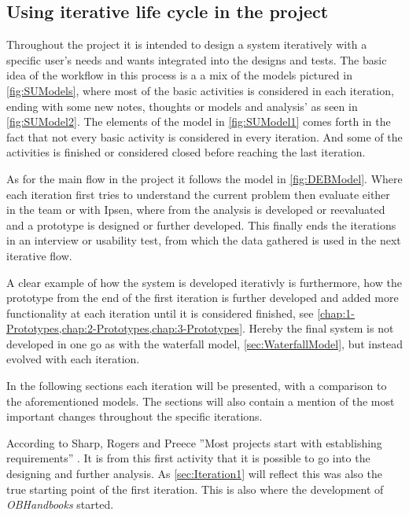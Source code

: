 \subsection{Using iterative life cycle in the project}
Throughout the project it is intended to design a system iteratively with a specific user’s needs and wants integrated into the designs and tests.
The basic idea of the workflow in this process is a a mix of the models pictured in \cref{fig:SUModels}, where most of the basic activities is considered in each iteration, ending with some new notes, thoughts or models and analysis' as seen in \cref{fig:SUModel2}.
The elements of the model in \cref{fig:SUModel1} comes forth in the fact that not every basic activity is considered in every iteration. And some of the activities is finished or considered closed before reaching the last iteration.

As for the main flow in the project it follows the model in \cref{fig:DEBModel}. Where each iteration first tries to understand the current problem then evaluate either in the team or with Ipsen, where from the analysis is developed or reevaluated and a prototype is designed or further developed.
This finally ends the iterations in an interview or usability test, from which the data gathered is used in the next iterative flow.

A clear example of how the system is developed iterativly is furthermore, how the prototype from the end of the first iteration is further developed and added more functionality at each iteration until it is considered finished, see \cref{chap:1-Prototypes,chap:2-Prototypes,chap:3-Prototypes}.
Hereby the final system is not developed in one go as with the waterfall model, \cref{sec:WaterfallModel},  but instead evolved with each iteration.

In the following sections each iteration will be presented, with a comparison to the aforementioned models.
The sections will also contain a mention of the most important changes throughout the specific iterations.

According to Sharp, Rogers and Preece ''Most projects start with establishing requirements'' \citep[p.~333]{InteractionDesign}.
It is from this first activity that it is possible to go into the designing and further analysis.
As \cref{sec:Iteration1} will reflect this was also the true starting point of the first iteration.
This is also where the development of \textit{OBHandbooks} started.

